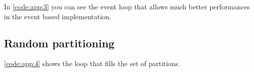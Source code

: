 \documentclass[a4paper,12pt]{article}
\begin{document}
In \ref{code:app:3} you can see the event loop that allows much better performances in the event based implementation.


\subsection{Random partitioning}

\ref{code:app:4} shows the loop that fills the set of partitions.

\makefig
\makeequ
\makeminted
\makealg
\makeind
\end{document}
